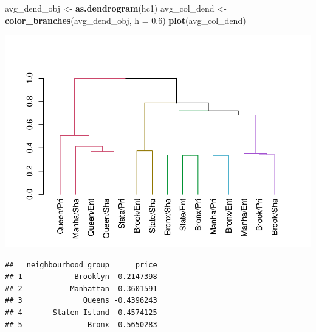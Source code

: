 \documentclass[
]{article}
\newenvironment{Shaded}{\begin{snugshade}}{\end{snugshade}}
\newcommand{\DataTypeTok}[1]{\textcolor[rgb]{0.13,0.29,0.53}{#1}}
\newcommand{\FloatTok}[1]{\textcolor[rgb]{0.00,0.00,0.81}{#1}}
\newcommand{\KeywordTok}[1]{\textcolor[rgb]{0.13,0.29,0.53}{\textbf{#1}}}
\newcommand{\NormalTok}[1]{#1}
\newcommand{\OperatorTok}[1]{\textcolor[rgb]{0.81,0.36,0.00}{\textbf{#1}}}
\newcommand{\StringTok}[1]{\textcolor[rgb]{0.31,0.60,0.02}{#1}}
\begin{document}
\begin{Shaded}
\begin{Highlighting}[]
\NormalTok{avg_dend_obj <-}\StringTok{ }\KeywordTok{as.dendrogram}\NormalTok{(hc1)}
\NormalTok{avg_col_dend <-}\StringTok{ }\KeywordTok{color_branches}\NormalTok{(avg_dend_obj, }\DataTypeTok{h =} \FloatTok{0.6}\NormalTok{)}
\KeywordTok{plot}\NormalTok{(avg_col_dend)}
\end{Highlighting}
\end{Shaded}

\includegraphics{project-code_files/figure-latex/unnamed-chunk-27-1.pdf}

\begin{Shaded}
\end{Shaded}

\begin{verbatim}
##   neighbourhood_group      price
## 1            Brooklyn -0.2147398
## 2           Manhattan  0.3601591
## 3              Queens -0.4396243
## 4       Staten Island -0.4574125
## 5               Bronx -0.5650283
\end{verbatim}
\end{document}
